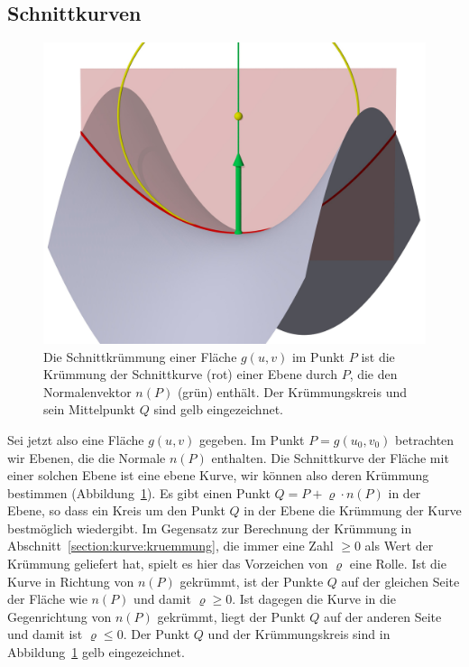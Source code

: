 \subsection{Schnittkurven}
\begin{figure}
\centering
\includegraphics[width=\hsize]{chapters/3d/schnittkruemmung.jpg}
\caption{Die Schnittkrümmung einer Fläche $g(u,v)$ im Punkt $P$ ist
die Krümmung der Schnittkurve (rot) einer Ebene durch $P$, die den
Normalenvektor $n(P)$ (grün) enthält.
Der Krümmungskreis und sein Mittelpunkt $Q$ sind gelb eingezeichnet.
\label{skript:schnittkruemmung}}
\end{figure}
Sei jetzt also eine Fläche $g(u,v)$ gegeben.
Im Punkt $P=g(u_0,v_0)$ betrachten wir Ebenen, die die Normale $n(P)$
enthalten.
Die Schnittkurve der Fläche mit einer solchen Ebene ist eine ebene
Kurve, wir können also deren Krümmung bestimmen
(Abbildung~\ref{skript:schnittkruemmung}).
Es gibt einen Punkt $Q = P + \varrho \cdot n(P)$ in der Ebene, so dass
ein Kreis um den Punkt $Q$ in der Ebene die Krümmung der Kurve bestmöglich
wiedergibt.
Im Gegensatz zur Berechnung der Krümmung in
Abschnitt~\ref{section:kurve:kruemmung}, die immer eine Zahl $\ge 0$
als Wert der Krümmung geliefert hat, spielt es hier das Vorzeichen von
$\varrho$ eine Rolle.
Ist die Kurve in Richtung von $n(P)$ gekrümmt, ist der Punkte $Q$ auf der
gleichen Seite der Fläche wie $n(P)$ und damit $\varrho\ge 0$.
Ist dagegen die Kurve in die Gegenrichtung von $n(P)$ gekrümmt, liegt der
Punkt $Q$ auf der anderen Seite und damit ist $\varrho\le 0$.
Der Punkt $Q$ und der Krümmungskreis sind in
Abbildung~\ref{skript:schnittkruemmung} gelb eingezeichnet.

